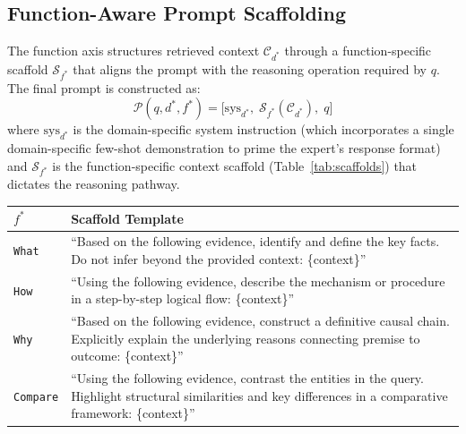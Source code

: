 \documentclass[a4paper,fleql,doubleblind]{cas-sc}
\begin{document}
\subsection{Function-Aware Prompt Scaffolding}
\label{ssec:functionaxis}
The function axis structures retrieved context $\mathcal{C}_{d^*}$ through
a function-specific scaffold $\mathcal{S}_{f^*}$ that aligns the prompt with
the reasoning operation required by $q$. The final prompt is constructed as:
\begin{equation}
    \mathcal{P}(q, d^*, f^*) = \big[ \text{sys}_{d^*},\;
    \mathcal{S}_{f^*}(\mathcal{C}_{d^*}),\; q \big]
    \label{eq:prompt}
\end{equation}
where $\text{sys}_{d^*}$ is the domain-specific system instruction
(which incorporates a single domain-specific few-shot demonstration to
prime the expert's response format) and $\mathcal{S}_{f^*}$ is the
function-specific context scaffold (Table~\ref{tab:scaffolds}) that
dictates the reasoning pathway.

\vspace{4pt}
\begin{center}
\begingroup
{}
\label{tab:scaffolds}
\renewcommand{\arraystretch}{1.4}
\begin{tabular}{l p{9cm}}
\toprule
$f^*$ & \textbf{Scaffold Template} \\
\midrule
\texttt{What}
  & ``Based on the following evidence, identify and define the key facts.
    Do not infer beyond the provided context: \{context\}'' \\
\midrule
\texttt{How}
  & ``Using the following evidence, describe the mechanism or procedure
    in a step-by-step logical flow: \{context\}'' \\
\midrule
\texttt{Why}
  & ``Based on the following evidence, construct a definitive causal chain.
    Explicitly explain the underlying reasons connecting premise to
    outcome: \{context\}'' \\
\midrule
\texttt{Compare}
  & ``Using the following evidence, contrast the entities in the query.
    Highlight structural similarities and key differences in a comparative
    framework: \{context\}'' \\
\bottomrule
\end{tabular}
\endgroup
\end{center}
\vspace{4pt}
\end{document}

